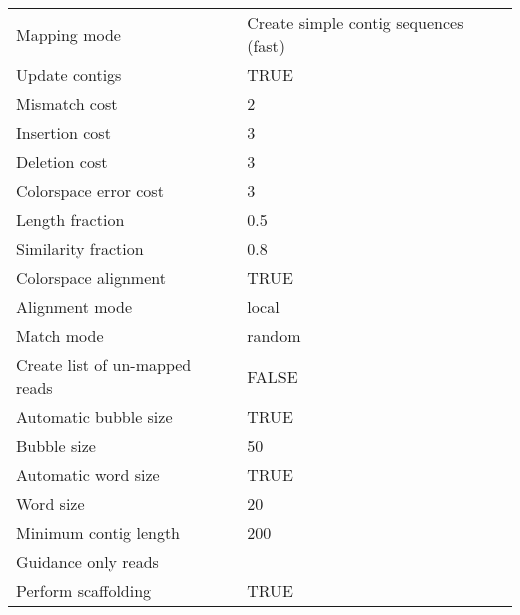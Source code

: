 \begin{scriptsize}
\begin{center}
\begin{longtable}{ll}
Mapping mode                                 & Create simple contig sequences (fast)          \\
Update contigs                               & TRUE                                           \\
Mismatch cost                                & 2                                              \\
Insertion cost                               & 3                                              \\
Deletion cost                                & 3                                              \\
Colorspace error cost                        & 3                                              \\
Length fraction                              & 0.5                                            \\
Similarity fraction                          & 0.8                                            \\
Colorspace alignment                         & TRUE                                           \\
Alignment mode                               & local                                          \\
Match mode                                   & random                                         \\
Create list of un-mapped reads               & FALSE                                          \\
Automatic bubble size                        & TRUE                                           \\
Bubble size                                  & 50                                             \\
Automatic word size                          & TRUE                                           \\
Word size                                    & 20                                             \\
Minimum contig length                        & 200                                            \\
Guidance only reads                          &                                                \\
Perform scaffolding                          & TRUE                                           \\

\end{longtable}
\end{center}
\end{scriptsize}

